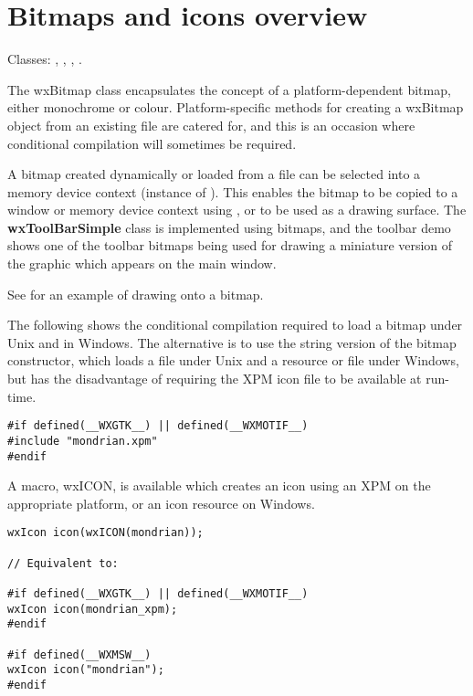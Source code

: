 \section{Bitmaps and icons overview}\label{wxbitmapoverview}

Classes: , , , .

The wxBitmap class encapsulates the concept of a platform-dependent bitmap,
either monochrome or colour. Platform-specific methods for creating a
wxBitmap object from an existing file are catered for, and
this is an occasion where conditional compilation will sometimes be
required.

A bitmap created dynamically or loaded from a file can be selected
into a memory device context (instance of ). This
enables the bitmap to be copied to a window or memory device context
using , or to be used as a drawing surface.  The {\bf
wxToolBarSimple} class is implemented using bitmaps, and the toolbar demo
shows one of the toolbar bitmaps being used for drawing a miniature
version of the graphic which appears on the main window.

See  for an example of drawing onto a bitmap.

The following shows the conditional compilation required to load a
bitmap under Unix and in Windows. The alternative is to use the string
version of the bitmap constructor, which loads a file under Unix and a
resource or file under Windows, but has the disadvantage of requiring the
XPM icon file to be available at run-time.

\begin{verbatim}
#if defined(__WXGTK__) || defined(__WXMOTIF__)
#include "mondrian.xpm"
#endif
\end{verbatim}

A macro, wxICON, is available which creates an icon using an XPM
on the appropriate platform, or an icon resource on Windows.

\begin{verbatim}
wxIcon icon(wxICON(mondrian));

// Equivalent to:

#if defined(__WXGTK__) || defined(__WXMOTIF__)
wxIcon icon(mondrian_xpm);
#endif

#if defined(__WXMSW__)
wxIcon icon("mondrian");
#endif
\end{verbatim}

